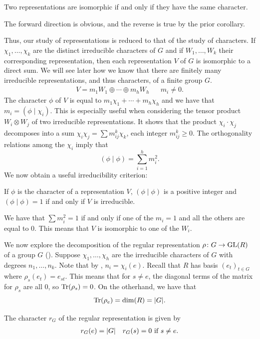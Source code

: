 \documentclass[letterpaper, 11pt, oneside]{book}
\begin{document}
\clearpage

\begin{cor}
  Two representations are isomorphic if and only if they have the same character.
\end{cor}
\begin{pf}
  The forward direction is obvious, and the reverse is true by the prior corollary.
\end{pf}

Thus, our study of representations is reduced to that of the study of characters.
If $\chi_{1}, \ldots, \chi_{k}$ are the distinct irreducible characters of $G$ and if $W_{1}, \ldots, W_{k}$ their corresponding representation, then each representation $V$ of $G$ is isomorphic to a direct sum.
We will see later how we know that there are finitely many irreducible representations, and thus characters, of a finite group $G$.
\begin{align*}
  V = m_{1}W_{1} \oplus \cdots \oplus m_{h}W_{h} && m_{i} \neq 0.
\end{align*}
The character $\phi$ of $V$ is equal to $m_{1}\chi_{1} + \cdots + m_{h}\chi_{h}$ and we have that $m_{i} = (\phi \mid \chi_{i})$.
This is especially useful when considering the tensor product $W_{i} \otimes W_{j}$ of two irreducible representations.
It shows that the product $\chi_{i} \cdot \chi_{j}$ decomposes into a sum $\chi_{i} \chi_{j} = \sum m_{ij}^{k} \chi_{k}$, each integer $m_{ij}^{k} \geq 0$.
The orthogonality relations among the $\chi_{i}$ imply that
\[
  (\phi \mid \phi) = \sum_{i = 1}^{h} m_{i}^{2}.
\]
We now obtain a useful irreducibility criterion:
\begin{thrm}\label{thrm:irreducibility_criterion}
  If $\phi$ is the character of a representation $V$, $(\phi \mid \phi)$ is a positive integer and $(\phi \mid \phi) = 1$ if and only if $V$ is irreducible.
\end{thrm}
\begin{pf}
  We have that $\sum m_{i}^{2} = 1$ if and only if one of the $m_{i} = 1$ and all the others are equal to $0$.
  This means that $V$ is isomorphic to one of the $W_{i}$.
\end{pf}

We now explore the decomposition of the regular representation $\rho\colon G \to \operatorname{GL}(R)$ of a group $G$ ().
Suppose $\chi_{1}, \ldots, \chi_{h}$ are the irreducible characters of $G$ with degrees $n_{1}, \ldots, n_{k}$.
Note that by , $n_{i} = \chi_{i}(e)$.
Recall that $R$ has basis $(e_{t})_{t \in G}$ where $\rho_{s}(e_{t}) = e_{st}$.
This means that for $s \neq e$, the diagonal terms of the matrix for $\rho_{s}$ are all $0$, so $\Tr(\rho_{s}) = 0$.
On the otherhand, we have that
\[
  \Tr(\rho_{e}) = \dim(R) = \abs{G}.
\]
\begin{prop}\label{prop:char_reg_rep}
  The character $r_{G}$ of the regular representation is given by
  \begin{align*}
    r_{G}(e) = \abs{G} && r_{G}(s) = 0 \text{ if } s \neq e.
  \end{align*}
\end{prop}
\end{document}
